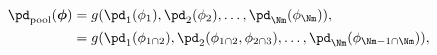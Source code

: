 \begin{align}
  \pd_{\text{pool}}(\boldsymbol{\phi})
  &= g(\pd_{1}(\phi_{1}), \pd_{2}(\phi_{2}), \ldots, \pd_{\Nm}(\phi_{\Nm})), \\
  &= g(\pd_{1}(\phi_{1 \cap 2}), \pd_{2}(\phi_{1 \cap 2}, \phi_{2 \cap 3}), \ldots, \pd_{\Nm}(\phi_{\Nm - 1 \cap \Nm})),
  \label{eqn:pooled-prior-general-def-two}
\end{align}